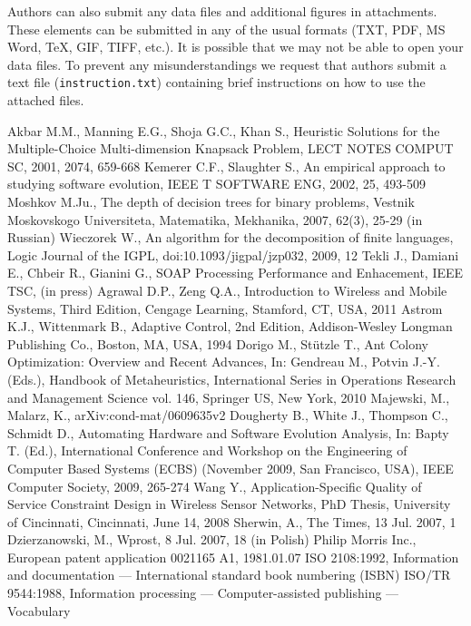 \documentclass[CEJCS,PDF]{cej} %
\begin{document}
Authors can also submit any data files and additional figures in attachments. These elements can be submitted in any of the usual formats (TXT, PDF, MS Word, TeX, GIF, TIFF, etc.). It is possible that we may not be able to open your data files. To prevent any misunderstandings we request that authors submit a text file ({\tt instruction.txt}) containing brief instructions on how to use the attached files.

\begin{thebibliography}{99}
 Akbar M.M., Manning E.G., Shoja G.C., Khan S., Heuristic Solutions for the Multiple-Choice Multi-dimension Knapsack Problem, LECT NOTES COMPUT SC, 2001, 2074, 659-668
 Kemerer C.F., Slaughter S., An empirical approach to studying software evolution, IEEE T SOFTWARE ENG, 2002, 25, 493-509 
 Moshkov M.Ju., The depth of decision trees for binary problems, Vestnik Moskovskogo Universiteta, Matematika, Mekhanika, 2007, 62(3), 25-29 (in Russian)
 Wieczorek W., An algorithm for the decomposition of finite languages, Logic Journal of the IGPL, doi:10.1093/jigpal/jzp032, 2009, 12
 Tekli J., Damiani E., Chbeir R., Gianini G., SOAP Processing Performance and Enhacement, IEEE TSC, (in press)
 Agrawal D.P., Zeng Q.A., Introduction to Wireless and Mobile Systems, Third Edition, Cengage Learning, Stamford, CT, USA, 2011
 Astrom K.J., Wittenmark B., Adaptive Control, 2nd Edition, Addison-Wesley Longman Publishing Co., Boston, MA, USA, 1994
 Dorigo M., St{\"u}tzle T., Ant Colony Optimization: Overview and Recent Advances, In: Gendreau M., Potvin J.-Y. (Eds.), Handbook of Metaheuristics, International Series in Operations Research and Management Science vol. 146, Springer US, New York, 2010
 Majewski, M., Malarz, K., arXiv:cond-mat/0609635v2
 Dougherty B., White J., Thompson C., Schmidt D., Automating Hardware and Software Evolution Analysis, In: Bapty T. (Ed.), International Conference and Workshop on the Engineering of Computer Based Systems (ECBS) (November 2009, San Francisco, USA), IEEE Computer Society, 2009, 265-274
 Wang Y., Application-Specific Quality of Service Constraint Design in Wireless Sensor Networks, PhD Thesis, University of Cincinnati, Cincinnati, June 14, 2008 
 Sherwin, A., The Times, 13 Jul. 2007, 1
 Dzierzanowski, M., Wprost, 8 Jul. 2007, 18 (in Polish)
 Philip Morris Inc., European patent application 0021165 A1, 1981.01.07
 ISO 2108:1992, Information and documentation --- International standard book numbering (ISBN)
 ISO/TR 9544:1988, Information processing --- Computer-assisted publishing --- Vocabulary
\end{thebibliography}
\end{document}
